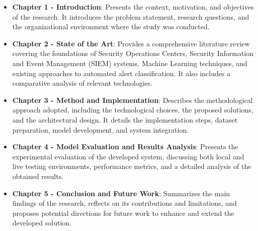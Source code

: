 \begin{itemize}
    \item \textbf{Chapter 1 - Introduction}: Presents the context, motivation, and objectives of the research. It introduces the problem statement, research questions, and the organizational environment where the study was conducted.
    \item \textbf{Chapter 2 - State of the Art}: Provides a comprehensive literature review covering the foundations of Security Operations Centers, Security Information and Event Management (SIEM) systems, Machine Learning techniques, and existing approaches to automated alert classification. It also includes a comparative analysis of relevant technologies.
    \item \textbf{Chapter 3 - Method and Implementation}: Describes the methodological approach adopted, including the technological choices, the proposed solutions, and the architectural design. It details the implementation steps, dataset preparation, model development, and system integration.
    \item \textbf{Chapter 4 - Model Evaluation and Results Analysis}: Presents the experimental evaluation of the developed system, discussing both local and live testing environments, performance metrics, and a detailed analysis of the obtained results.
    \item \textbf{Chapter 5 - Conclusion and Future Work}: Summarizes the main findings of the research, reflects on its contributions and limitations, and proposes potential directions for future work to enhance and extend the developed solution.
\end{itemize}

%